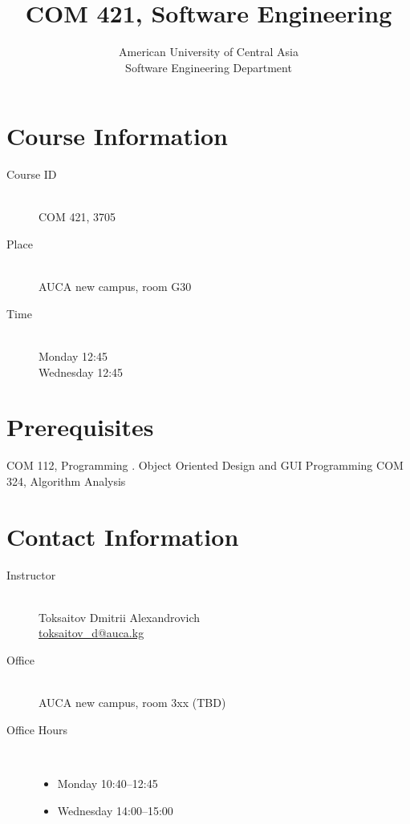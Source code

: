 \documentclass[12pt,a4paper,oneside]{article}
\begin{document}
    \title{COM 421, Software Engineering}
    \author{
        American University of Central Asia\\
        Software Engineering Department
    }
    \date{}
    \maketitle

    \section{Course Information}

        \begin{description}
            \item[Course ID]\hfill\\
                COM 421, 3705
            \item[Place]\hfill\\
                AUCA new campus, room G30
            \item[Time]\hfill\\
                Monday 12:45\\
                Wednesday 12:45
        \end{description}

    \section{Prerequisites}

        COM 112, Programming \uppercase\expandafter{\relax}. Object Oriented Design and GUI Programming
        COM 324, Algorithm Analysis

        \section{Contact Information}

            \begin{description}
                \item[Instructor]\hfill\\
                    Toksaitov Dmitrii Alexandrovich\\
                    \href{mailto:toksaitov_d@auca.kg}{toksaitov\_d@auca.kg}
                \item[Office]\hfill\\
                    AUCA new campus, room 3xx (TBD)
                \item[Office Hours]\hfill\\
                    \begin{itemize}
                        \item Monday 10:40--12:45
                        \item Wednesday 14:00--15:00
                    \end{itemize}
        \end{description}
\end{document}
